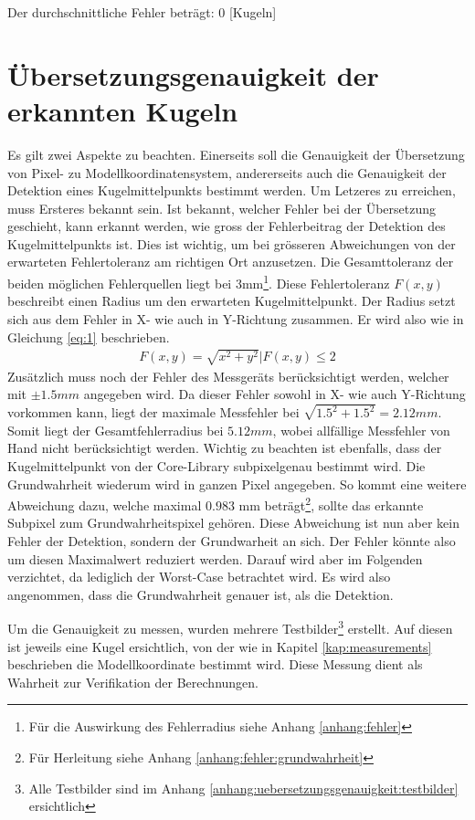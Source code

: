 Der durchschnittliche Fehler beträgt: 0 [Kugeln]

\section{Übersetzungsgenauigkeit der erkannten Kugeln}\label{kap:uebersetzungsgenauigkeit}
Es gilt zwei Aspekte zu beachten. Einerseits soll die Genauigkeit der Übersetzung von Pixel- zu Modellkoordinatensystem,
andererseits auch die Genauigkeit der Detektion eines Kugelmittelpunkts bestimmt werden.
Um Letzeres zu erreichen, muss Ersteres bekannt sein. Ist bekannt, welcher Fehler bei der Übersetzung geschieht, kann
erkannt werden, wie gross der Fehlerbeitrag der Detektion des Kugelmittelpunkts ist. Dies ist wichtig, um bei
grösseren Abweichungen von der erwarteten Fehlertoleranz am richtigen Ort anzusetzen. Die Gesamttoleranz der beiden
möglichen Fehlerquellen liegt bei 3mm\footnote{Für die Auswirkung des Fehlerradius siehe Anhang \ref{anhang:fehler}}. Diese Fehlertoleranz $F(x,y)$ beschreibt einen Radius um den erwarteten Kugelmittelpunkt.
Der Radius setzt sich aus dem Fehler in X- wie auch in Y-Richtung zusammen. Er wird also wie in Gleichung \ref{eq:1} beschrieben.
\begin{align}
    F(x,y) = \sqrt{x^2 + y^2} | F(x,y) \leq 2\label{eq:1}
\end{align}
Zusätzlich muss noch der Fehler des Messgeräts berücksichtigt werden, welcher mit $\pm 1.5mm$ angegeben wird. Da dieser
Fehler sowohl in X- wie auch Y-Richtung vorkommen kann, liegt der maximale Messfehler bei $\sqrt{1.5^2 + 1.5^2} = 2.12mm$. Somit liegt
der Gesamtfehlerradius bei $5.12mm$, wobei allfällige Messfehler von Hand nicht berücksichtigt werden. Wichtig zu beachten ist
ebenfalls, dass der Kugelmittelpunkt von der Core-Library subpixelgenau bestimmt wird. Die Grundwahrheit wiederum wird in
ganzen Pixel angegeben. So kommt eine weitere Abweichung dazu, welche maximal $0.983$ mm beträgt\footnote{Für Herleitung siehe Anhang \ref{anhang:fehler:grundwahrheit}},
sollte das erkannte Subpixel zum Grundwahrheitspixel gehören.
Diese Abweichung ist nun aber kein Fehler der Detektion, sondern der Grundwarheit an sich. Der Fehler könnte also um diesen
Maximalwert reduziert werden. Darauf wird aber im Folgenden verzichtet, da lediglich der Worst-Case betrachtet wird. Es wird
also angenommen, dass die Grundwahrheit genauer ist, als die Detektion.

Um die Genauigkeit zu messen, wurden mehrere Testbilder\footnote{Alle Testbilder sind im Anhang \ref{anhang:uebersetzungsgenauigkeit:testbilder} ersichtlich}
erstellt. Auf diesen ist jeweils eine Kugel ersichtlich, von der
wie in Kapitel \ref{kap:measurements} beschrieben die Modellkoordinate bestimmt wird. Diese Messung dient als Wahrheit zur
Verifikation der Berechnungen.

